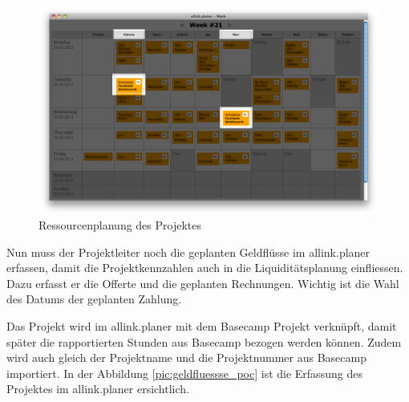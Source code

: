 \begin{figure}[htbp]
\begin{center}
\includegraphics[width=1.0\textwidth,angle=0]{./bilder/proof_of_concept/ressourenplan_poc.png}
\caption[Ressourcenplanung des Projektes]{Ressourcenplanung des Projektes\footnotemark}
\label{pic:ressourenplan_poc}
\end{center}
\end{figure}

Nun muss der Projektleiter noch die geplanten Geldflüsse im allink.planer erfassen, 
damit die Projektkennzahlen auch in die Liquiditätsplanung einfliessen. Dazu erfasst er
die Offerte und die geplanten Rechnungen. Wichtig ist die Wahl des Datums der 
geplanten Zahlung.

Das Projekt wird im allink.planer mit dem Basecamp Projekt verknüpft, damit später 
die rapportierten Stunden aus Basecamp bezogen werden können. Zudem wird auch gleich der Projektname
und die Projektnummer aus Basecamp importiert. In der Abbildung \ref{pic:geldfluessse_poc}
ist die Erfassung des Projektes im allink.planer ersichtlich.

